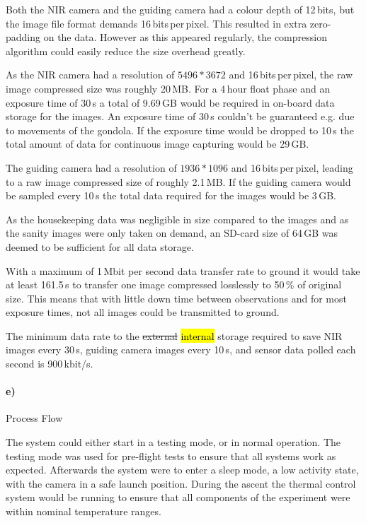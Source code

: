 Both the NIR camera and the guiding camera had a colour depth of 12\,bits, but the image file format demands 16\,bits\,per\,pixel. This resulted in extra zero-padding on the data. However as this appeared regularly, the compression algorithm could easily reduce the size overhead greatly.

As the NIR camera had a resolution of $5496 * 3672$ and 16\,bits\,per\,pixel, the raw image compressed size was roughly 20\,MB. For a 4\,hour float phase and an exposure time of 30\,s a total of  9.69\,GB would be required in on-board data storage for the images. An exposure time of 30\,s couldn't be guaranteed e.g. due to movements of the gondola. If the exposure time would be dropped to 10\,s the total amount of data for continuous image capturing would be 29\,GB.

The guiding camera had a resolution of $1936 * 1096$ and 16\,bits\,per\,pixel, leading to a raw image compressed size of roughly 2.1\,MB. If the guiding camera would be sampled every 10\,s the total data required for the images would be 3\,GB.

As the housekeeping data was negligible in size compared to the images and as the sanity images were only taken on demand, an SD-card size of 64\,GB was deemed to be sufficient for all data storage.

With a maximum of 1\,Mbit per second data transfer rate to ground it would take at least 161.5\,s to transfer one image compressed losslessly to 50\,\% of original size. This means that with little down time between observations and for most exposure times, not all images could be transmitted to ground.

The minimum data rate to the \st{external} \hl{internal} storage required to save NIR images every 30\,s, guiding camera images every 10\,s, and sensor data polled each second is 900\,kbit/s.


\paragraph{e)} Process Flow

The system could either start in a testing mode, or in normal operation. The testing mode was used for pre-flight tests to ensure that all systems work as expected. Afterwards the system were to enter a sleep mode, a low activity state, with the camera in a safe launch position. During the ascent the thermal control system would be running to ensure that all components of the experiment were within nominal temperature ranges.

